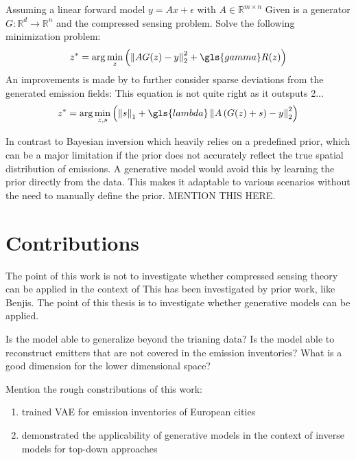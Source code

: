 Assuming a linear forward model $y = Ax + \epsilon$ with $A \in \mathbb{R}^{m \times n}$
Given is a generator $G: \mathbb{R}^d \to \mathbb{R}^n$ and the compressed sensing problem.
Solve the following minimization problem:
\begin{equation}
    z^* = \arg\min_{z}{\left( \norm{A G(z) - y}_2^2 + \gls{gamma} R(z) \right)}
\end{equation}
An improvements is made by to further consider sparse deviations from the generated emission fields:
This equation is not quite right as it outsputs 2...
\begin{equation}
    z^* = \arg\min_{z, s}{\left(\norm{s}_1 + \gls{lambda} \norm{A \left( G(z) + s \right) - y}_2^2 \right)}
\end{equation}

In contrast to Bayesian inversion which heavily relies on a predefined prior, which can be a major limitation if the prior does not accurately reflect the true spatial distribution of emissions.
A generative model would avoid this by learning the prior directly from the data.
This makes it adaptable to various scenarios without the need to manually define the prior.
MENTION THIS HERE.

\section{Contributions}
The point of this work is not to investigate whether compressed sensing theory can be applied in the context of 
This has been investigated by prior work, like Benjis.
The point of this thesis is to investigate whether generative models can be applied.

Is the model able to generalize beyond the trianing data?
Is the model able to reconstruct emitters that are not covered in the emission inventories? 
What is a good dimension for the lower dimensional space?

Mention the rough constributions of this work:
\begin{enumerate}
    \item trained VAE for emission inventories of European cities
    \item demonstrated the applicability of generative models in the context of inverse models for top-down approaches
\end{enumerate}
